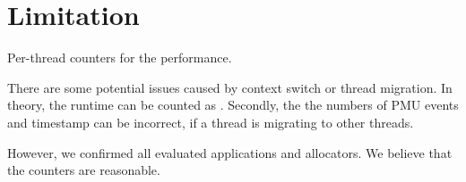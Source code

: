 \section{Limitation}

\label{sec:limitation}

Per-thread counters for the performance. 

There are some potential issues caused by context switch or thread migration. In theory, the runtime can be counted as . Secondly, the the numbers of PMU events and timestamp can be incorrect, if a thread is migrating to other threads. 

However, we confirmed all evaluated applications and allocators. We believe that the counters are reasonable. 
